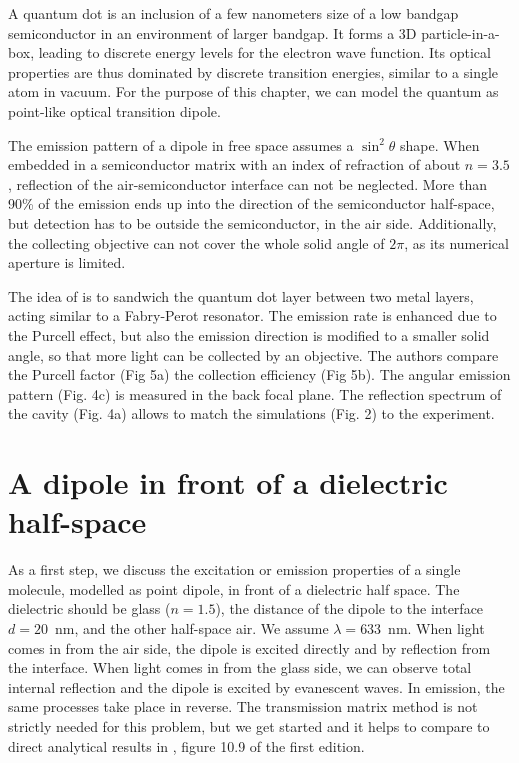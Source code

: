 A quantum dot is an inclusion of a few nanometers size of a low bandgap semiconductor in an environment of larger bandgap. It forms a 3D particle-in-a-box, leading to discrete energy levels for the electron wave function. Its optical properties are thus dominated by discrete transition energies, similar to a single atom in vacuum. For the purpose of this chapter, we can model  the quantum as point-like optical transition dipole.

The emission pattern of a dipole in free space assumes a $\sin^2 \theta$ shape. When embedded in a semiconductor matrix with an index of refraction of about $n = 3.5$, reflection of the air-semiconductor interface can not be neglected. More than 90\% of the emission ends up into the direction of the semiconductor half-space, but detection has to be outside the semiconductor, in the air side. Additionally, the collecting objective can not cover the whole solid angle of  $2\pi$, as its numerical aperture is limited.

The idea of \cite{Huang_AOM_21} is to sandwich the quantum dot layer between two metal layers, acting similar to a Fabry-Perot resonator. The emission rate is enhanced due to the Purcell effect, but also the emission direction is modified to a smaller solid angle, so that more light can be collected by an objective. The authors compare the Purcell factor (Fig 5a) the collection efficiency (Fig 5b). The angular emission pattern (Fig. 4c) is measured in the back focal plane. The reflection spectrum of the cavity (Fig. 4a) allows to match the simulations (Fig. 2) to the experiment.



\section{A dipole in front of a dielectric half-space}

As a first step, we discuss the excitation or emission properties of a single molecule, modelled as point dipole, in front of a dielectric half space. The dielectric should be glass ($n = 1.5$), the distance of the dipole to the interface $d=20$~nm, and the other half-space air. We assume $\lambda = 633$~nm. When light comes in from the air side, the dipole is excited directly and by reflection from the interface. When light comes in from the glass side, we can observe total internal reflection and the dipole is excited by evanescent waves. In emission, the same processes take place in reverse. The transmission matrix method is not strictly needed for this problem, but we get started and it helps to compare to direct analytical results in \cite{Novotny-Hecht2012}, figure 10.9 of the first edition.

